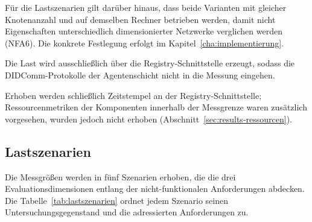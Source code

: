 Für die Lastszenarien gilt darüber hinaus, dass beide Varianten mit gleicher Knotenanzahl und auf demselben Rechner betrieben werden, damit nicht Eigenschaften unterschiedlich dimensionierter Netzwerke verglichen werden (NFA6). Die konkrete Festlegung erfolgt im Kapitel~\ref{cha:implementierung}.

Die Last wird ausschließlich über die Registry-Schnittstelle erzeugt, sodass die DIDComm-Protokolle der Agentenschicht nicht in die Messung eingehen.

Erhoben werden schließlich Zeitstempel an der Registry-Schnittstelle; Ressourcenmetriken der Komponenten innerhalb der Messgrenze waren zusätzlich vorgesehen, wurden jedoch nicht erhoben (Abschnitt~\ref{sec:results-ressourcen}).

\subsection{Lastszenarien}
\label{subsec:eval-szenarien}

Die Messgrößen werden in fünf Szenarien erhoben, die die drei Evaluationsdimensionen entlang der nicht-funktionalen Anforderungen abdecken. Die Tabelle~\ref{tab:lastszenarien} ordnet jedem Szenario seinen Untersuchungsgegenstand und die adressierten Anforderungen zu.

